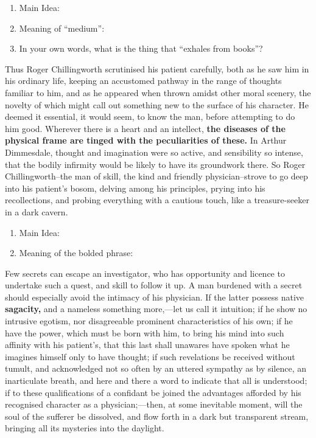 \begin{enumerate}
\item Main Idea: \hrulefill
\item Meaning of ``medium'': \hrulefill
\item In your own words, what is the thing that ``exhales from books''? \hrulefill
\end{enumerate}

\begin{linenumbers}
\modulolinenumbers[5]
\indent Thus Roger Chillingworth scrutinised his patient carefully, both as he saw him in his ordinary life, keeping an accustomed pathway in the range of thoughts familiar to him, and as he appeared when thrown amidst other moral scenery, the novelty of which might call out something new to the surface of his character. He deemed it essential, it would seem, to know the man, before attempting to do him good. Wherever there is a heart and an intellect, \textbf{the diseases of the physical frame are tinged with the peculiarities of these.} In Arthur Dimmesdale, thought and imagination were so active, and sensibility so intense, that the bodily infirmity would be likely to have its groundwork there. So Roger Chillingworth--the man of skill, the kind and friendly physician--strove to go deep into his patient's bosom, delving among his principles, prying into his recollections, and probing everything with a cautious touch, like a treasure-seeker in a dark cavern.
\end{linenumbers}

\begin{enumerate}
\item Main Idea: \hrulefill
\item Meaning of the bolded phrase: \hrulefill
\end{enumerate}

\begin{linenumbers}
\modulolinenumbers[5]
\indent Few secrets can escape an investigator, who has opportunity and licence to undertake such a quest, and skill to follow it up. A man burdened with a secret should especially avoid the intimacy of his physician. If the latter possess native \textbf{sagacity,} and a nameless something more,—let us call it intuition; if he show no intrusive egotism, nor disagreeable prominent characteristics of his own; if he have the power, which must be born with him, to bring his mind into such affinity with his patient's, that this last shall unawares have spoken what he imagines himself only to have thought; if such revelations be received without tumult, and acknowledged not so often by an uttered sympathy as by silence, an inarticulate breath, and here and there a word to indicate that all is understood; if to these qualifications of a confidant be joined the advantages afforded by his recognised character as a physician;—then, at some inevitable moment, will the soul of the sufferer be dissolved, and flow forth in a dark but transparent stream, bringing all its mysteries into the daylight.
\end{linenumbers}

